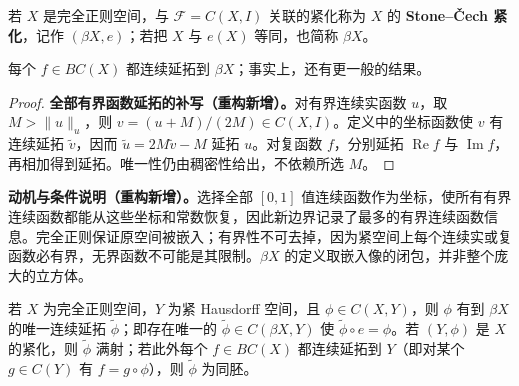 \documentclass[../../main.tex]{subfiles}
\begin{document}
\begin{definition}\label{definition:ch04-stone-cech}
若 $X$ 是完全正则空间，与 $\mathcal F=C(X,I)$ 关联的紧化称为 $X$ 的 \textbf{Stone--Čech 紧化}，记作 $(\beta X,e)$；若把 $X$ 与 $e(X)$ 等同，也简称 $\beta X$。
\end{definition}
每个 $f\in BC(X)$ 都连续延拓到 $\beta X$；事实上，还有更一般的结果。
\begin{proof}
\textbf{全部有界函数延拓的补写（重构新增）。}对有界连续实函数 $u$，取 $M>\|u\|_u$，则 $v=(u+M)/(2M)\in C(X,I)$。定义中的坐标函数使 $v$ 有连续延拓 $\widetilde v$，因而 $\widetilde u=2M\widetilde v-M$ 延拓 $u$。对复函数 $f$，分别延拓 $\operatorname{Re}f$ 与 $\operatorname{Im}f$，再相加得到延拓。唯一性仍由稠密性给出，不依赖所选 $M$。
\end{proof}
\begin{remark}
\textbf{动机与条件说明（重构新增）。}选择全部 $[0,1]$ 值连续函数作为坐标，使所有有界连续函数都能从这些坐标和常数恢复，因此新边界记录了最多的有界连续函数信息。完全正则保证原空间被嵌入；有界性不可去掉，因为紧空间上每个连续实或复函数必有界，无界函数不可能是其限制。$\beta X$ 的定义取嵌入像的闭包，并非整个庞大的立方体。
\end{remark}
\begin{theorem}\label{theorem:ch04-stone-cech-universal}
若 $X$ 为完全正则空间，$Y$ 为紧 Hausdorff 空间，且 $\phi\in C(X,Y)$，则 $\phi$ 有到 $\beta X$ 的唯一连续延拓 $\widetilde\phi$；即存在唯一的 $\widetilde\phi\in C(\beta X,Y)$ 使 $\widetilde\phi\circ e=\phi$。若 $(Y,\phi)$ 是 $X$ 的紧化，则 $\widetilde\phi$ 满射；若此外每个 $f\in BC(X)$ 都连续延拓到 $Y$（即对某个 $g\in C(Y)$ 有 $f=g\circ\phi$），则 $\widetilde\phi$ 为同胚。
\end{theorem}
\end{document}
